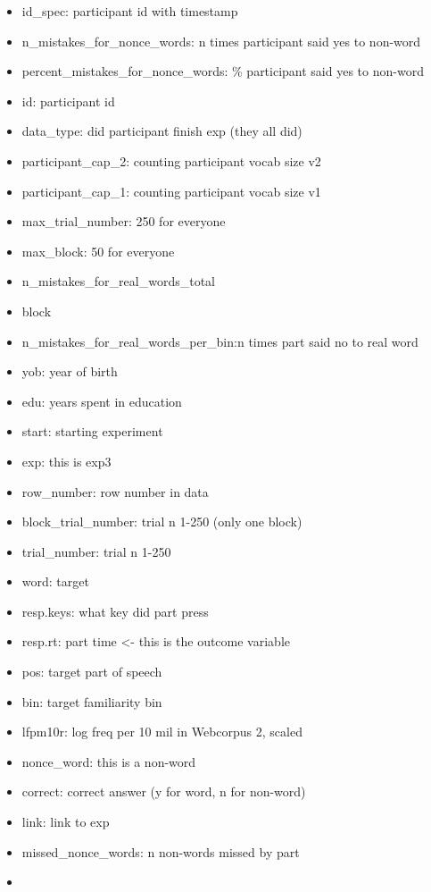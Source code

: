 \documentclass[
]{article}
\providecommand{\tightlist}{%
  \setlength{\itemsep}{0pt}\setlength{\parskip}{0pt}}
\begin{document}
\begin{itemize}
\tightlist
\item
  id\_spec: participant id with timestamp
\item
  n\_mistakes\_for\_nonce\_words: n times participant said yes to
  non-word
\item
  percent\_mistakes\_for\_nonce\_words: \% participant said yes to
  non-word
\item
  id: participant id
\item
  data\_type: did participant finish exp (they all did)
\item
  participant\_cap\_2: counting participant vocab size v2
\item
  participant\_cap\_1: counting participant vocab size v1
\item
  max\_trial\_number: 250 for everyone
\item
  max\_block: 50 for everyone
\item
  n\_mistakes\_for\_real\_words\_total
\item
  block
\item
  n\_mistakes\_for\_real\_words\_per\_bin:n times part said no to real
  word
\item
  yob: year of birth
\item
  edu: years spent in education
\item
  start: starting experiment
\item
  exp: this is exp3
\item
  row\_number: row number in data
\item
  block\_trial\_number: trial n 1-250 (only one block)
\item
  trial\_number: trial n 1-250
\item
  word: target
\item
  resp.keys: what key did part press
\item
  resp.rt: part time \textless- this is the outcome variable
\item
  pos: target part of speech
\item
  bin: target familiarity bin
\item
  lfpm10r: log freq per 10 mil in Webcorpus 2, scaled
\item
  nonce\_word: this is a non-word
\item
  correct: correct answer (y for word, n for non-word)
\item
  link: link to exp
\item
  missed\_nonce\_words: n non-words missed by part
\item

\end{itemize}
\end{document}
